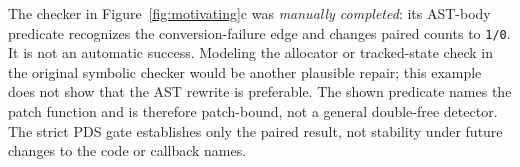 The checker in Figure~\ref{fig:motivating}c was \emph{manually completed}:
its AST-body predicate recognizes the conversion-failure edge and changes
paired counts to \texttt{1/0}.  It is not an automatic \toolname success.
Modeling the allocator or tracked-state check in the original symbolic
checker would be another plausible repair; this example does not show
that the AST rewrite is preferable.  The shown predicate names the patch
function and is therefore patch-bound, not a general double-free detector.
The strict PDS gate establishes only the paired result, not stability
under future changes to the code or callback names.
